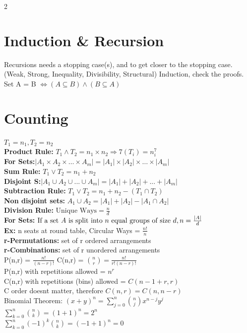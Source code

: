 \documentclass[10pt]{article}
\begin{document}
\begin{multicols*}{2}
\section{Induction \& Recursion}
Recursions needs a stopping case(s), and to get closer to the stopping case.\\
(Weak, Strong, Inequality, Divisibility, Structural) Induction, check the proofs.\\
Set A = B $\iff (A \subseteq B) \land (B \subseteq A)$
\section{Counting}
$T_1 = n_1, T_2 = n_2$\\
\textbf{{Product Rule:}} $T_1 \land T_2 = n_1 \times n_2 \Rightarrow 7(T_i) = n_i^7$\\
\textbf{For Sets:}$|A_1 \times A_2 \times \ldots \times A_m | = |A_1| \times |A_2| \times \ldots \times |A_m|$\\
\textbf{Sum Rule:} $T_1 \lor T_2 = n_1 + n_2$\\
\textbf{Disjoint S:}$|A_1 \cup A_2 \cup ... \cup A_m | = |A_1| + |A_2| + ... + |A_m|$\\
\textbf{Subtraction Rule:} $T_1 \lor T_2 = n_1 + n_2 - (T_1 \cap T_2)$\\
\textbf{Non disjoint sets:} $A_1 \cup A_2 = |A_1| + |A_2| - |A_1 \cap A_2|$\\
\textbf{Division Rule:} $\text{Unique Ways} = \frac{n}{d}$\\
\textbf{For Sets:} $\text{If a set } A \text{ is split into } n \text{ equal groups of size } d,\\
n = \frac{|A|}{d}$\\
\textbf{Ex:} n seats at round table, Circular Ways = $\frac{n!}{n}$\\
\textbf{r-Permutations:} set of r ordered arrangements\\
\textbf{r-Combinations:} set of r unordered arrangements\\
P(n,r) = $\frac{n!}{(n-r)!}$\hspace{1cm} C(n,r) = $\binom{n}{r}= \frac{n!}{r!(n-r)!}$\\
P(n,r) with repetitions allowed = $n^r$\\
C(n,r) with repetitions (bins) allowed = $C(n-1+r,r)$\\
C order doesnt matter, therefore $C(n, r) = C(n, n-r)$\\
Binomial Theorem: $(x+y)^n = \sum_{j=0}^{n}\binom{n}{j}x^{n-j}y^j$\\
$\sum_{k=0}^{n}\binom{n}{k} = (1+1)^n = 2^n$\\
$\sum_{k=0}^{n}(-1)^k\binom{n}{k}= (-1+1)^n=0$

\end{multicols*}
\end{document}
